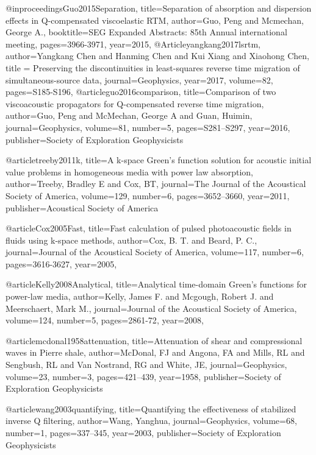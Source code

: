 @inproceedings{Guo2015Separation,
  title={Separation of absorption and dispersion effects in {Q}-compensated viscoelastic {RTM}},
  author={Guo, Peng and Mcmechan, George A.},
  booktitle={SEG Expanded Abstracts: 85th Annual international meeting},
  pages={3966-3971},
  year={2015},
}
@Article{yangkang2017lsrtm,
  author={Yangkang Chen and Hanming Chen and Kui Xiang and Xiaohong Chen},
  title = {Preserving the discontinuities in least-squares reverse time migration of simultaneous-source data},
  journal={Geophysics},
  year=2017,
  volume=82,
  pages={S185-S196},
}
@article{guo2016comparison,
  title={Comparison of two viscoacoustic propagators for {Q}-compensated reverse time migration},
  author={Guo, Peng and McMechan, George A and Guan, Huimin},
  journal={Geophysics},
  volume={81},
  number={5},
  pages={S281--S297},
  year={2016},
  publisher={Society of Exploration Geophysicists}
}


@article{treeby2011k,
  title={A k-space Green's function solution for acoustic initial value problems in homogeneous media with power law absorption},
  author={Treeby, Bradley E and Cox, BT},
  journal={The Journal of the Acoustical Society of America},
  volume={129},
  number={6},
  pages={3652--3660},
  year={2011},
  publisher={Acoustical Society of America}
}

@article{Cox2005Fast,
  title={Fast calculation of pulsed photoacoustic fields in fluids using k-space methods},
  author={Cox, B. T. and Beard, P. C.},
  journal={Journal of the Acoustical Society of America},
  volume={117},
  number={6},
  pages={3616-3627},
  year={2005},
}

@article{Kelly2008Analytical,
  title={Analytical time-domain Green's functions for power-law media},
  author={Kelly, James F. and Mcgough, Robert J. and Meerschaert, Mark M.},
  journal={Journal of the Acoustical Society of America},
  volume={124},
  number={5},
  pages={2861-72},
  year={2008},
}

@article{mcdonal1958attenuation,
  title={Attenuation of shear and compressional waves in Pierre shale},
  author={McDonal, FJ and Angona, FA and Mills, RL and Sengbush, RL and Van Nostrand, RG and White, JE},
  journal={Geophysics},
  volume={23},
  number={3},
  pages={421--439},
  year={1958},
  publisher={Society of Exploration Geophysicists}
}

@article{wang2003quantifying,
  title={Quantifying the effectiveness of stabilized inverse {Q} filtering},
  author={Wang, Yanghua},
  journal={Geophysics},
  volume={68},
  number={1},
  pages={337--345},
  year={2003},
  publisher={Society of Exploration Geophysicists}
}

